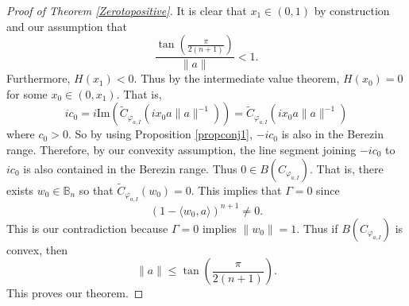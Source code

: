 \documentclass{amsart}
\theoremstyle{remark}
\begin{document}
\begin{proof}[Proof of Theorem \ref{Zerotopositive}]
It is clear that $x_1\in (0,1)$ by construction and our assumption that
\[\frac{\tan\left(\frac{\pi}{2\left(n+1\right)}\right)}{\|a\|}<1.\]
Furthermore, $H(x_1)<0$. Thus by the intermediate value theorem, $H(x_0)=0$ for some $x_0\in (0,x_1)$.  That is, \[ic_0=i\mathrm{Im}\left(\widetilde{C}_{\varphi_{a,I}}(ix_0a\|a\|^{-1})\right)=\widetilde{C}_{\varphi_{a,I}}(ix_0a\|a\|^{-1})\] where $c_0>0$.  So by using Proposition \ref{propconj1}, $-ic_0$ is also in the Berezin range. Therefore, by our convexity assumption, the line segment joining $-ic_0$ to $ic_0$ is also contained in the Berezin range.  Thus $0\in B({C}_{\varphi_{a,I}})$.  That is, there exists $w_0\in \mathbb{B}_n$ so that $\widetilde{C}_{\varphi_{a,I}}(w_0)=0$. This implies that $\Gamma=0$ since \[\left(1-\langle w_0,a\rangle\right)^{n+1}\neq 0.\]  This is our contradiction because $\Gamma=0$ implies $\|w_0\|=1$.  Thus if $B({C}_{\varphi_{a,I}})$ is convex, then \[\|a\|\leq \tan\left(\frac{\pi}{2(n+1)}\right). \] This proves our theorem.
\end{proof}
\end{document}
